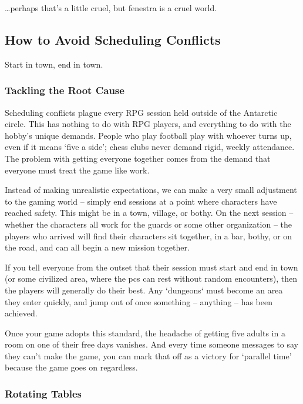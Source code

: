 \begin{multicols}{2}
\begin{speechtext}
\end{speechtext}

\noindent
\ldots perhaps that's a little cruel, but \gls{fenestra} is a cruel world.

\subsection{How to Avoid Scheduling Conflicts}

Start in town, end in town.

\subsubsection{Tackling the Root Cause}

Scheduling conflicts plague every RPG session held outside of the Antarctic circle.
This has nothing to do with RPG players, and everything to do with the hobby's unique demands.
People who play football play with whoever turns up, even if it means `five a side'; chess clubs never demand rigid, weekly attendance.
The problem with getting everyone together comes from the demand that everyone must treat the game like work.

Instead of making unrealistic expectations, we can make a very small adjustment to the gaming world -- simply end sessions at a point where characters have reached safety.
This might be in a town, \gls{village}, or \gls{bothy}.
On the next session -- whether the characters all work for the \glspl{guard} or some other organization -- the players who arrived will find their characters sit together, in a bar, \gls{bothy}, or on the road, and can all begin a new mission together.

If you tell everyone from the outset that their session must start and end in town (or some civilized area, where the \glspl{pc} can rest without random encounters), then the players will generally do their best.
Any `dungeons` must become an area they enter quickly, and jump out of once something -- anything -- has been achieved.

Once your game adopts this standard, the headache of getting five adults in a room on one of their free days vanishes.
And every time someone messages to say they can't make the game, you can mark that off as a victory for `parallel time' because the game goes on regardless.

\subsubsection{Rotating Tables}


\end{multicols}
